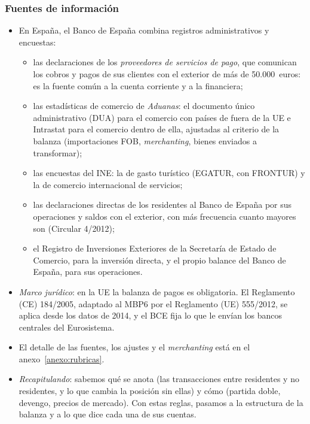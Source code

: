 \documentclass[11pt]{article}
\begin{document}
\subsubsection{Fuentes de información}\label{sec:fuentes}

\begin{itemize}
\item En España, el Banco de España combina registros administrativos y encuestas\nocite{BdE2025NotaMet}:
  \begin{itemize}
  \item las declaraciones de los \emph{proveedores de servicios de pago}, que comunican los cobros y pagos de sus clientes con el exterior de más de 50.000~euros: es la fuente común a la cuenta corriente y a la financiera;
  \item las estadísticas de comercio de \emph{Aduanas}: el documento único administrativo (DUA) para el comercio con países de fuera de la UE e Intrastat para el comercio dentro de ella, ajustadas al criterio de la balanza (importaciones FOB, \emph{merchanting}, bienes enviados a transformar);
  \item las encuestas del INE: la de gasto turístico (EGATUR, con FRONTUR) y la de comercio internacional de servicios;
  \item las declaraciones directas de los residentes al Banco de España por sus operaciones y saldos con el exterior, con más frecuencia cuanto mayores son (Circular 4/2012)\nocite{BOE2012Circular4};
  \item el Registro de Inversiones Exteriores de la Secretaría de Estado de Comercio, para la inversión directa, y el propio balance del Banco de España, para sus operaciones.
  \end{itemize}
\item \emph{Marco jurídico}: en la UE la balanza de pagos es obligatoria. El Reglamento (CE) 184/2005, adaptado al MBP6 por el Reglamento (UE) 555/2012, se aplica desde los datos de 2014, y el BCE fija lo que le envían los bancos centrales del Eurosistema\nocite{UE2005Reg184,UE2012Reg555,BCE2011Orientacion23}.
\item El detalle de las fuentes, los ajustes y el \emph{merchanting} está en el anexo~\ref{anexo:rubricas}.
\end{itemize}

\begin{itemize}
\item \emph{Recapitulando}: sabemos qué se anota (las transacciones entre residentes y no residentes, y lo que cambia la posición sin ellas) y cómo (partida doble, devengo, precios de mercado). Con estas reglas, pasamos a la estructura de la balanza y a lo que dice cada una de sus cuentas.
\end{itemize}
\end{document}
